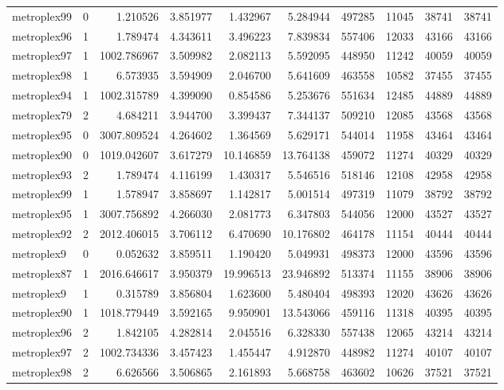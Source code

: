 \documentclass[../../../thesis.tex]{subfiles}
\begin{document}
\begin{longtable}{|l|r|r|r|r|r|r|r|r|r|}
metroplex99 & 0 & 1.210526 & 3.851977 & 1.432967 & 5.284944 & 497285 & 11045 & 38741 & 38741 \\
metroplex96 & 1 & 1.789474 & 4.343611 & 3.496223 & 7.839834 & 557406 & 12033 & 43166 & 43166 \\
metroplex97 & 1 & 1002.786967 & 3.509982 & 2.082113 & 5.592095 & 448950 & 11242 & 40059 & 40059 \\
metroplex98 & 1 & 6.573935 & 3.594909 & 2.046700 & 5.641609 & 463558 & 10582 & 37455 & 37455 \\
metroplex94 & 1 & 1002.315789 & 4.399090 & 0.854586 & 5.253676 & 551634 & 12485 & 44889 & 44889 \\
metroplex79 & 2 & 4.684211 & 3.944700 & 3.399437 & 7.344137 & 509210 & 12085 & 43568 & 43568 \\
metroplex95 & 0 & 3007.809524 & 4.264602 & 1.364569 & 5.629171 & 544014 & 11958 & 43464 & 43464 \\
metroplex90 & 0 & 1019.042607 & 3.617279 & 10.146859 & 13.764138 & 459072 & 11274 & 40329 & 40329 \\
metroplex93 & 2 & 1.789474 & 4.116199 & 1.430317 & 5.546516 & 518146 & 12108 & 42958 & 42958 \\
metroplex99 & 1 & 1.578947 & 3.858697 & 1.142817 & 5.001514 & 497319 & 11079 & 38792 & 38792 \\
metroplex95 & 1 & 3007.756892 & 4.266030 & 2.081773 & 6.347803 & 544056 & 12000 & 43527 & 43527 \\
metroplex92 & 2 & 2012.406015 & 3.706112 & 6.470690 & 10.176802 & 464178 & 11154 & 40444 & 40444 \\
metroplex9 & 0 & 0.052632 & 3.859511 & 1.190420 & 5.049931 & 498373 & 12000 & 43596 & 43596 \\
metroplex87 & 1 & 2016.646617 & 3.950379 & 19.996513 & 23.946892 & 513374 & 11155 & 38906 & 38906 \\
metroplex9 & 1 & 0.315789 & 3.856804 & 1.623600 & 5.480404 & 498393 & 12020 & 43626 & 43626 \\
metroplex90 & 1 & 1018.779449 & 3.592165 & 9.950901 & 13.543066 & 459116 & 11318 & 40395 & 40395 \\
metroplex96 & 2 & 1.842105 & 4.282814 & 2.045516 & 6.328330 & 557438 & 12065 & 43214 & 43214 \\
metroplex97 & 2 & 1002.734336 & 3.457423 & 1.455447 & 4.912870 & 448982 & 11274 & 40107 & 40107 \\
metroplex98 & 2 & 6.626566 & 3.506865 & 2.161893 & 5.668758 & 463602 & 10626 & 37521 & 37521 \\

\end{longtable}
\end{document}
